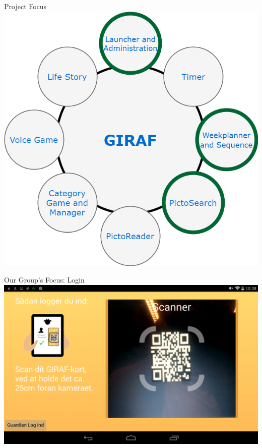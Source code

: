 \begin{frame}{Project Focus}
\includegraphics[scale=0.32]{figures/GirafFocus.png} 
\end{frame}

\begin{frame}{Our Group's Focus: Login}
\includegraphics[scale=0.21]{figures/Login.png} 
\end{frame}

